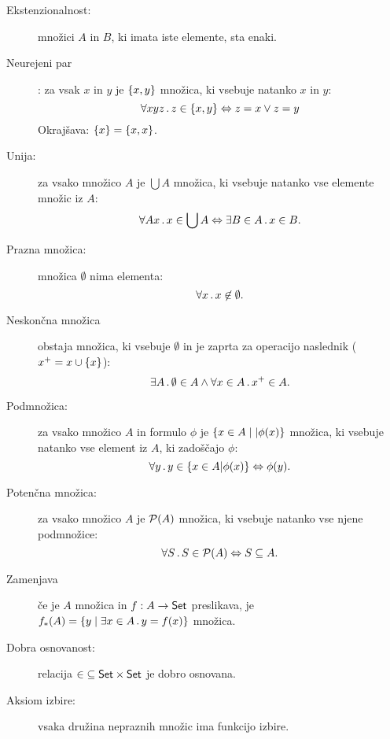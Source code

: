 \begin{description}

\item[Ekstenzionalnost:] množici $A$ in $B$, ki imata iste elemente, sta enaki.

\item[Neurejeni par]: za vsak $x$ in $y$ je $\left\{x, y\right\}$ množica, ki vsebuje natanko $x$ in $y$:
  \begin{equation*}
    \forall x y z \,.\, z \in \left\{x, y\right\} \Leftrightarrow z = x \lor z = y
  \end{equation*}
  Okrajšava: $\left\{x\right\} = \left\{x, x\right\}$.

\item[Unija:] za vsako množico $A$ je $\bigcup A$ množica, ki vsebuje natanko vse
  elemente množic iz $A$:
  \begin{equation*}
    \forall A x \,.\, x \in \bigcup A \Leftrightarrow \exists B \in A \,.\, x \in B.
  \end{equation*}

\item[Prazna množica:] množica $\emptyset$ nima elementa:
  \begin{equation*}
  \forall x \,.\, x \not\in \emptyset.
  \end{equation*}

\item[Neskončna množica] obstaja množica, ki vsebuje $\emptyset$ in je zaprta za operacijo naslednik
  (${x^{+}} = x \cup \left\{x\right\}$):
  \begin{equation*}
    \exists A \,.\, \emptyset \in A \land \forall x \in A \,.\, {x^{+}} \in A.
  \end{equation*}

\item[Podmnožica:] za vsako množico $A$ in formulo $\phi$ je $\left\{x \in A \mid| \phi(x)\right\}$
  množica, ki vsebuje natanko vse element iz $A$, ki zadoščajo $\phi$:
  \begin{equation*}
    \forall y \,.\, y \in \{x \in A | \phi(x)\} \Leftrightarrow \phi(y).
  \end{equation*}

\item[Potenčna množica:] za vsako množico $A$ je $\mathcal{P}(A)$ množica, ki vsebuje
  natanko vse njene podmnožice:
  \begin{equation*}
    \forall S \,.\, S \in \mathcal{P}(A) \Leftrightarrow S \subseteq A.
  \end{equation*}

\item[Zamenjava] če je $A$ množica in $f : A \to \mathsf{Set}$ preslikava, je
  $
    f_{*}(A) = \left\{ y \mid \exists x \in A \,.\, y = f(x) \right\}
  $
  množica.

\item[Dobra osnovanost:] relacija ${\in} \subseteq \mathsf{Set} \times \mathsf{Set}$ je dobro osnovana.

\item[Aksiom izbire:] vsaka družina nepraznih množic ima funkcijo izbire.
\end{description}


